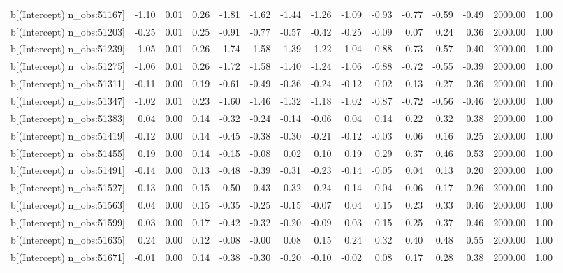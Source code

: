 \begin{table}[ht]
\begin{tabular}{rrrrrrrrrrrrrrr}
  b[(Intercept) n\_obs:51167] & -1.10 & 0.01 & 0.26 & -1.81 & -1.62 & -1.44 & -1.26 & -1.09 & -0.93 & -0.77 & -0.59 & -0.49 & 2000.00 & 1.00 \\ 
  b[(Intercept) n\_obs:51203] & -0.25 & 0.01 & 0.25 & -0.91 & -0.77 & -0.57 & -0.42 & -0.25 & -0.09 & 0.07 & 0.24 & 0.36 & 2000.00 & 1.00 \\ 
  b[(Intercept) n\_obs:51239] & -1.05 & 0.01 & 0.26 & -1.74 & -1.58 & -1.39 & -1.22 & -1.04 & -0.88 & -0.73 & -0.57 & -0.40 & 2000.00 & 1.00 \\ 
  b[(Intercept) n\_obs:51275] & -1.06 & 0.01 & 0.26 & -1.72 & -1.58 & -1.40 & -1.24 & -1.06 & -0.88 & -0.72 & -0.55 & -0.39 & 2000.00 & 1.00 \\ 
  b[(Intercept) n\_obs:51311] & -0.11 & 0.00 & 0.19 & -0.61 & -0.49 & -0.36 & -0.24 & -0.12 & 0.02 & 0.13 & 0.27 & 0.36 & 2000.00 & 1.00 \\ 
  b[(Intercept) n\_obs:51347] & -1.02 & 0.01 & 0.23 & -1.60 & -1.46 & -1.32 & -1.18 & -1.02 & -0.87 & -0.72 & -0.56 & -0.46 & 2000.00 & 1.00 \\ 
  b[(Intercept) n\_obs:51383] & 0.04 & 0.00 & 0.14 & -0.32 & -0.24 & -0.14 & -0.06 & 0.04 & 0.14 & 0.22 & 0.32 & 0.38 & 2000.00 & 1.00 \\ 
  b[(Intercept) n\_obs:51419] & -0.12 & 0.00 & 0.14 & -0.45 & -0.38 & -0.30 & -0.21 & -0.12 & -0.03 & 0.06 & 0.16 & 0.25 & 2000.00 & 1.00 \\ 
  b[(Intercept) n\_obs:51455] & 0.19 & 0.00 & 0.14 & -0.15 & -0.08 & 0.02 & 0.10 & 0.19 & 0.29 & 0.37 & 0.46 & 0.53 & 2000.00 & 1.00 \\ 
  b[(Intercept) n\_obs:51491] & -0.14 & 0.00 & 0.13 & -0.48 & -0.39 & -0.31 & -0.23 & -0.14 & -0.05 & 0.04 & 0.13 & 0.20 & 2000.00 & 1.00 \\ 
  b[(Intercept) n\_obs:51527] & -0.13 & 0.00 & 0.15 & -0.50 & -0.43 & -0.32 & -0.24 & -0.14 & -0.04 & 0.06 & 0.17 & 0.26 & 2000.00 & 1.00 \\ 
  b[(Intercept) n\_obs:51563] & 0.04 & 0.00 & 0.15 & -0.35 & -0.25 & -0.15 & -0.07 & 0.04 & 0.15 & 0.23 & 0.33 & 0.46 & 2000.00 & 1.00 \\ 
  b[(Intercept) n\_obs:51599] & 0.03 & 0.00 & 0.17 & -0.42 & -0.32 & -0.20 & -0.09 & 0.03 & 0.15 & 0.25 & 0.37 & 0.46 & 2000.00 & 1.00 \\ 
  b[(Intercept) n\_obs:51635] & 0.24 & 0.00 & 0.12 & -0.08 & -0.00 & 0.08 & 0.15 & 0.24 & 0.32 & 0.40 & 0.48 & 0.55 & 2000.00 & 1.00 \\ 
  b[(Intercept) n\_obs:51671] & -0.01 & 0.00 & 0.14 & -0.38 & -0.30 & -0.20 & -0.10 & -0.02 & 0.08 & 0.17 & 0.28 & 0.38 & 2000.00 & 1.00 \\ 

\end{tabular}
\end{table}
